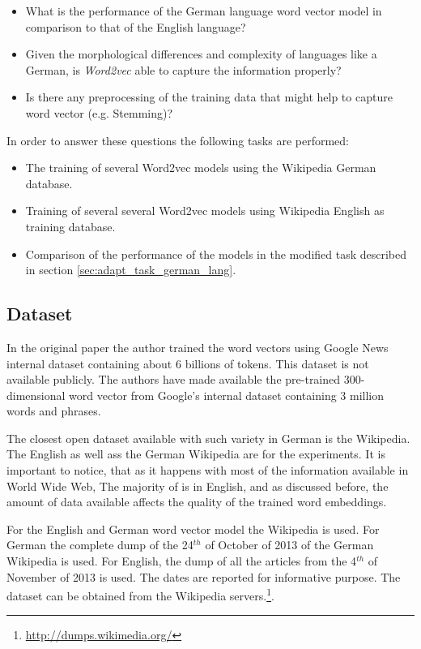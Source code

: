 \begin{itemize}
\item What is the performance of the German language word vector model in comparison to that of
  the English language?
\item Given the morphological differences and complexity of languages like
  a German, is \textit{Word2vec} able to capture the information properly?
\item Is there any preprocessing of the training data  that might help to capture word vector
  (e.g. Stemming)?
\end{itemize}

In order to answer these questions the following tasks are performed:

\begin{itemize}
\item The training of several Word2vec models using the Wikipedia German
  database.
\item Training of several several Word2vec models using Wikipedia English as
  training  database.
\item Comparison of the performance of the models in the modified task
  described in section \ref{sec:adapt_task_german_lang}.
\end{itemize}


\subsection{Dataset}
\label{experiments:sub:dataset}

In the original paper \cite{DBLP:journals/corr/abs-1301-3781} the author
trained the word vectors using Google News internal dataset containing about
6 billions of tokens. This dataset is not available publicly. The authors have made
available the pre-trained 300-dimensional  word vector  from  Google's internal
dataset containing 3 million words and phrases.

The closest open dataset available with such variety in German is the
Wikipedia. The English  as well ass the German Wikipedia are for the experiments.  It is
important to notice, that as it happens with most of the information
available in World Wide Web, The majority of is in English, and as discussed
before, the amount of data available affects the quality  of the trained word embeddings. 

For the English and German word vector model  the Wikipedia is used. For
German the complete dump of the 24$^{th}$ of October of 2013 of the German
Wikipedia is used.  For English, the dump of all the articles from the
4$^{th}$ of November of 2013 is used. The dates are reported for informative
purpose. The dataset can be obtained from the Wikipedia
servers.\footnote{\url{http://dumps.wikimedia.org/}}.

